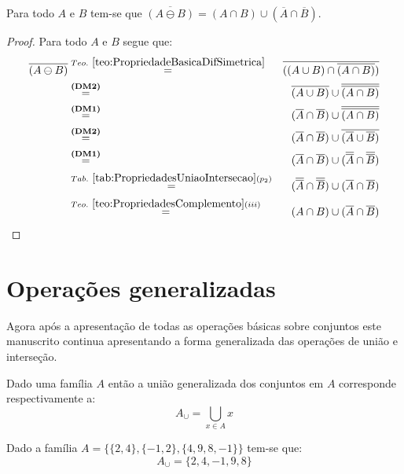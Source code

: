 \begin{theorem}
	Para todo $A$ e $B$ tem-se que $\overline{(A \ominus B)} = (A \cap B) \cup (\overline{A} \cap \overline{B})$.
\end{theorem}

\begin{proof}
	Para todo $A$ e $B$ segue que:
	\begin{eqnarray*}
		\overline{(A \ominus B)} & \stackrel{Teo. \ \ref{teo:PropriedadeBasicaDifSimetrica}}{=} & \overline{((A \cup B) \cap \overline{(A \cap B)})}\\
		& \stackrel{\textbf{(DM2)}}{=}& \overline{(A \cup B)} \cup \overline{\overline{(A \cap B)}}\\
		& \stackrel{\textbf{(DM1)}}{=}& (\overline{A} \cap \overline{B}) \cup \overline{\overline{(A \cap B)}}\\
		& \stackrel{\textbf{(DM2)}}{=}& (\overline{A} \cap \overline{B}) \cup \overline{(\overline{A} \cup \overline{B})}\\
		& \stackrel{\textbf{(DM1)}}{=}& (\overline{A} \cap \overline{B}) \cup (\overline{\overline{A}} \cap \overline{\overline{B}})\\
		& \stackrel{Tab. \ \ref{tab:PropriedadesUniaoIntersecao}(p_2)}{=}& (\overline{\overline{A}} \cap \overline{\overline{B}}) \cup (\overline{A} \cap \overline{B})\\
		& \stackrel{Teo. \ \ref{teo:PropriedadesComplemento}(iii)}{=}& (A \cap B) \cup (\overline{A} \cap \overline{B})
	\end{eqnarray*}
\end{proof}

\section{Operações generalizadas}

Agora após a apresentação de todas as operações básicas sobre conjuntos este manuscrito continua apresentando a forma generalizada das operações de união e interseção. 

\begin{definition}\label{def:UniaoGeneralizadas}
	Dado uma família $A$ então a união generalizada dos conjuntos em $A$ corresponde respectivamente a:
	$$A_\cup = \bigcup_{x \in A} x$$
\end{definition}

\begin{exem}
	Dado a família $A = \{\{2, 4\}, \{-1, 2\}, \{4, 9, 8, -1\}\}$ tem-se que:
	$$A_\cup = \{2, 4, -1, 9, 8\}$$
\end{exem}

